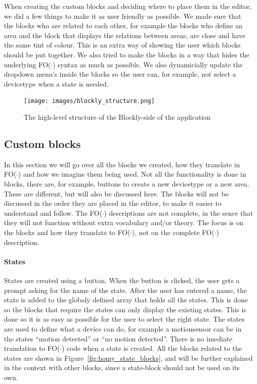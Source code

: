 \documentclass[11pt,a4paper]{report}
\newcommand{\fodot}{FO($\cdot$)\xspace}
\begin{document}
When creating the custom blocks and deciding where to place them in the editor, we did a few things to make it as user friendly as possible. We made sure that the blocks who are related to each other, for example the blocks who define an area and the block that displays the relations between areas, are close and have the same tint of colour. This is an extra way of showing the user which blocks should be put together. We also tried to make the blocks in a way that hides the underlying \fodot syntax as much as possible. We also dynamicially update the dropdown menu's inside the blocks so the user can, for example, not select a devicetype when a state is needed.

\begin{figure}
    \centering
    \texttt{[image: images/blockly\_structure.png]}
    \caption{The high-level structure of the Blockly-side of the application}
    \label{fig:blockly_structure}
\end{figure}

\subsection{Custom blocks}
In this section we will go over all the blocks we created, how they translate in \fodot and how we imagine them being used. Not all the functionality is done in blocks, there are, for example, buttons to create a new devicetype or a new area. These are different, but will also be discussed here. The blocks will not be discussed in the order they are placed in the editor, to make it easier to understand and follow. The \fodot descriptions are not complete, in the sence that they will not function without extra vocabulary and/or theory. The focus is on the blocks and how they translate to \fodot, not on the complete \fodot description.

\paragraph{States}
States are created using a button. When the button is clicked, the user gets a prompt asking for the name of the state. After the user has entered a name, the state is added to the globaly defined array that holds all the states. This is done so the blocks that require the states can only display the existing states. This is done so it is as easy as possible for the user to select the right state. The states are used to define what a device can do, for example a motionsensor can be in the states ``motion detected'' or ``no motion detected''. There is no imediate translation to \fodot code when a state is created. All the blocks related to the states are shown in Figure~\ref{fig:homy_state_blocks}, and will be further explained in the context with other blocks, since a state-block should not be used on its own.
\end{document}
